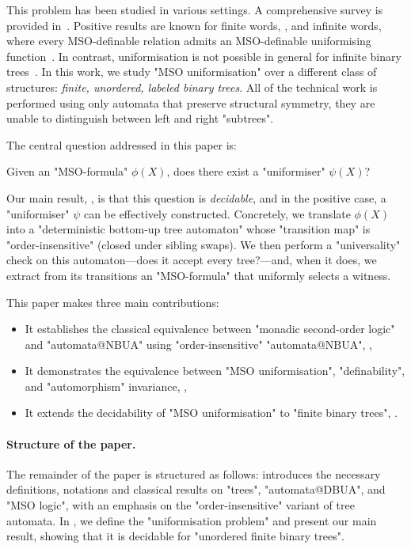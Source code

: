 \documentclass[a4paper,UKenglish,cleveref, autoref, thm-restate]{lipics-v2021}
\begin{document}
This problem has been studied in various settings. A comprehensive survey is provided in~\cite{Cara15}. Positive results are known for finite words, \cite{Choffrut1999},
and infinite words, where every MSO-definable relation admits an MSO-definable uniformising function~\cite{Siefkes1975, Choffrut1999, Rabin07}. In contrast, uniformisation
is not possible in general for infinite binary trees~\cite{GS83}.
In this work, we study "MSO uniformisation" over a different class of structures: \emph{finite, unordered, labeled binary trees}.
All of the technical work is performed using only automata that preserve structural symmetry,
\ie they are unable to distinguish between left and right "subtrees".

The central question addressed in this paper is:

\begin{problem}\label{prob:uniformisation-problem}
\AP Given an "MSO-formula" $\phi(X)$, does there exist a "uniformiser" $\psi(X)$?
\end{problem}

Our main result, , is that this question is \emph{decidable}, and in the positive case, a "uniformiser" $\psi$ can be effectively constructed. Concretely, we translate $\phi(X)$ into a
"deterministic bottom-up tree automaton" whose "transition map" is "order-insensitive" (\ie closed under sibling swaps). We then perform a "universality" check on this
automaton—does it accept every tree?—and, when it does, we extract from its transitions an "MSO-formula" that uniformly selects a witness.

This paper makes three main contributions:
\begin{itemize}
	\item It establishes the classical equivalence between "monadic second-order logic" and "automata@NBUA" using "order-insensitive" "automata@NBUA", ,
	\item It demonstrates the equivalence between "MSO uniformisation", "definability", and "automorphism" invariance, ,
	\item It extends the decidability of "MSO uniformisation" to "finite binary trees", .
\end{itemize}


\paragraph*{Structure of the paper.} The remainder of the paper is structured as follows:
 introduces the necessary definitions, notations and classical results on "trees", "automata@DBUA", and "MSO logic", with an emphasis on the "order-insensitive"
variant of tree automata.
In , we define the "uniformisation problem" and present our main result, showing that it is decidable for "unordered finite binary trees".
\end{document}
